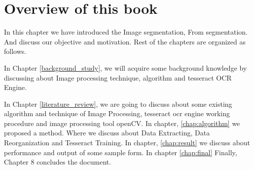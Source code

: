 \section{Overview of this book}
In this chapter we have introduced the Image segmentation, From segmentation. And discuss our objective and motivation. Rest of the chapters are organized as follows.

In Chapter \ref{background_study}, we will acquire some background knowledge by discussing about Image processing technique, algorithm and tesseract OCR Engine.

In Chapter \ref{literature_review}, we are going to discuss about some existing algorithm and technique of Image Processing, tesseract ocr engine working procedure and image processing tool openCV.
In chapter, \ref{chap:algorithm} we proposed a method. Where we discuss about Data Extracting, Data Reorganization and Tesseract Training.
In chapter, \ref{chap:result} we discuss about performance and output of some sample form.
In chapter \ref{chap:final} Finally, Chapter 8 concludes the document.


